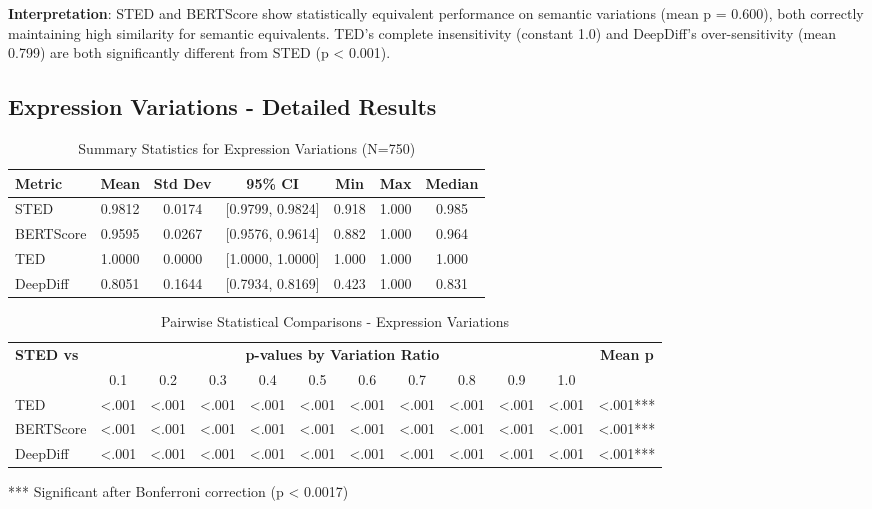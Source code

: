 \documentclass{article}
\begin{document}
\textbf{Interpretation}: STED and BERTScore show statistically equivalent performance on semantic variations (mean p = 0.600), both correctly maintaining high similarity for semantic equivalents. TED's complete insensitivity (constant 1.0) and DeepDiff's over-sensitivity (mean 0.799) are both significantly different from STED (p < 0.001).

\subsection{Expression Variations - Detailed Results}

\begin{table}[H]
\centering
\caption{Summary Statistics for Expression Variations (N=750)}
\label{tab:expression-stats-detailed}
\begin{tabular}{lcccccc}
\toprule
\textbf{Metric} & \textbf{Mean} & \textbf{Std Dev} & \textbf{95\% CI} & \textbf{Min} & \textbf{Max} & \textbf{Median} \\
\midrule
STED & 0.9812 & 0.0174 & [0.9799, 0.9824] & 0.918 & 1.000 & 0.985 \\
BERTScore & 0.9595 & 0.0267 & [0.9576, 0.9614] & 0.882 & 1.000 & 0.964 \\
TED & 1.0000 & 0.0000 & [1.0000, 1.0000] & 1.000 & 1.000 & 1.000 \\
DeepDiff & 0.8051 & 0.1644 & [0.7934, 0.8169] & 0.423 & 1.000 & 0.831 \\
\bottomrule
\end{tabular}
\end{table}

\begin{table}[H]
\centering
\caption{Pairwise Statistical Comparisons - Expression Variations}
\label{tab:expression-pairwise}
\small
\begin{tabular}{lccccccccccc}
\toprule
\textbf{STED vs} & \multicolumn{10}{c}{\textbf{p-values by Variation Ratio}} & \textbf{Mean p} \\
\cmidrule{2-11}
& 0.1 & 0.2 & 0.3 & 0.4 & 0.5 & 0.6 & 0.7 & 0.8 & 0.9 & 1.0 & \\
\midrule
TED & <.001 & <.001 & <.001 & <.001 & <.001 & <.001 & <.001 & <.001 & <.001 & <.001 & <.001*** \\
BERTScore & <.001 & <.001 & <.001 & <.001 & <.001 & <.001 & <.001 & <.001 & <.001 & <.001 & <.001*** \\
DeepDiff & <.001 & <.001 & <.001 & <.001 & <.001 & <.001 & <.001 & <.001 & <.001 & <.001 & <.001*** \\
\bottomrule
\end{tabular}
\vspace{0.3em}
\small{*** Significant after Bonferroni correction (p < 0.0017)}
\end{table}
\end{document}
